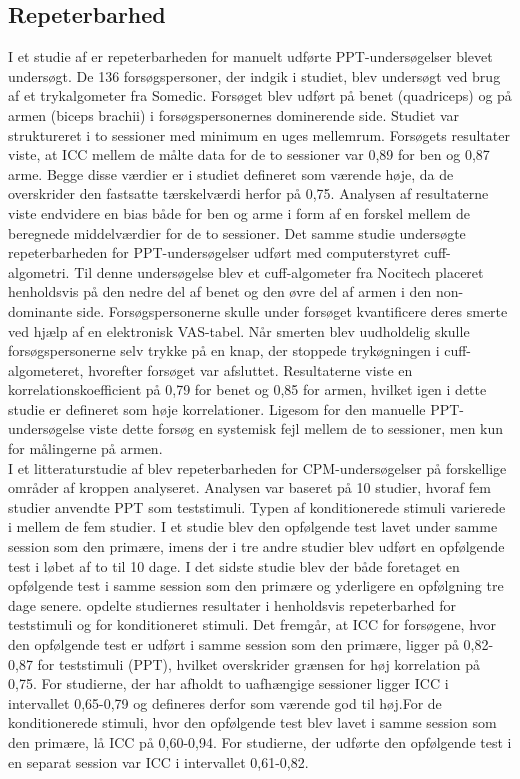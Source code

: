 \subsection{Repeterbarhed}
I et studie af  er repeterbarheden for manuelt udførte PPT-undersøgelser blevet undersøgt. De 136 forsøgspersoner, der indgik i studiet, blev undersøgt ved brug af et trykalgometer fra Somedic.  Forsøget blev udført på benet (quadriceps) og på armen (biceps brachii) i forsøgspersonernes dominerende side. Studiet var struktureret i to sessioner med minimum en uges mellemrum. Forsøgets resultater viste, at ICC mellem de målte data for de to sessioner var 0,89 for ben og 0,87 arme. Begge disse værdier er i studiet defineret som værende høje, da de overskrider den fastsatte tærskelværdi herfor på 0,75. Analysen af resultaterne viste endvidere en bias både for ben og arme i form af en forskel mellem de beregnede middelværdier for de to sessioner. Det samme studie undersøgte repeterbarheden for PPT-undersøgelser udført med computerstyret cuff-algometri. Til denne undersøgelse blev et cuff-algometer fra Nocitech placeret henholdsvis på den nedre del af benet og den øvre del af armen i den non-dominante side. Forsøgspersonerne skulle under forsøget kvantificere deres smerte ved hjælp af en elektronisk VAS-tabel. Når smerten blev uudholdelig skulle forsøgspersonerne selv trykke på en knap, der stoppede trykøgningen i cuff-algometeret, hvorefter forsøget var afsluttet. Resultaterne viste en korrelationskoefficient på 0,79 for benet og 0,85 for armen, hvilket igen i dette studie er defineret som høje korrelationer. Ligesom for den manuelle PPT-undersøgelse viste dette forsøg en systemisk fejl mellem de to sessioner, men kun for målingerne på armen.\\
I et litteraturstudie af  blev repeterbarheden for CPM-undersøgelser på forskellige områder af kroppen analyseret. Analysen var baseret på 10 studier, hvoraf fem studier anvendte PPT som teststimuli. Typen af konditionerede stimuli varierede i mellem de fem studier. I et studie blev den opfølgende test lavet under samme session som den primære, imens der i tre andre studier blev udført en opfølgende test i løbet af to til 10 dage. I det sidste studie blev der både foretaget en opfølgende test i samme session som den primære og yderligere en opfølgning tre dage senere.  opdelte studiernes resultater i henholdsvis repeterbarhed for teststimuli og for konditioneret stimuli. Det fremgår, at ICC for forsøgene, hvor den opfølgende test er udført i samme session som den primære, ligger på 0,82-0,87 for teststimuli (PPT), hvilket overskrider grænsen for høj korrelation på 0,75. For studierne, der har afholdt to uafhængige sessioner ligger ICC i intervallet 0,65-0,79 og defineres derfor som værende god til høj.For de konditionerede stimuli, hvor den opfølgende test blev lavet i samme session som den primære, lå ICC på 0,60-0,94. For studierne, der udførte den opfølgende test i en separat session var ICC i intervallet 0,61-0,82.\\ 
